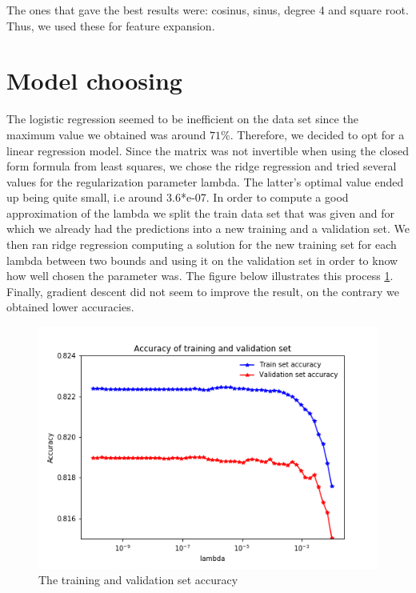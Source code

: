 \documentclass[10pt,conference,compsocconf]{IEEEtran}
\begin{document}
The ones that gave the best results were: cosinus, sinus, degree 4 and square root. Thus, we used these for feature expansion.

\section{Model choosing}
The logistic regression seemed to be inefficient on the data set since the maximum value we obtained was around $71\%$. Therefore, we decided to opt for a linear regression model. Since the matrix was not invertible when using the closed form formula from least squares, we chose the ridge regression and tried several values for the regularization parameter lambda. The latter's optimal value ended up being quite small, i.e around 3.6*e-07. In order to compute a good approximation of the lambda we split the train data set that was given and for which we already had the predictions into a new training and a validation set. We then ran ridge regression computing a solution for the new training set for each lambda between two bounds and using it on the validation set in order to know how well chosen the parameter was. The figure below illustrates this process \ref{fig:training-and-validation-set-accuracy}. Finally, gradient descent did not seem to improve the result, on the contrary we obtained lower accuracies.

\begin{figure}[h!]
	\centering
  \includegraphics[width=\columnwidth]{validation.png}
  \caption{The training and validation set accuracy}
	\label{fig:training-and-validation-set-accuracy}
\end{figure}
\end{document}
